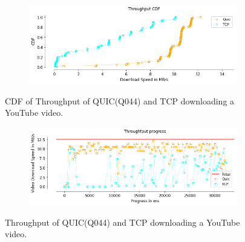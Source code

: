 \begin{frame}

\begin{figure}[!htb]
    \centering
    \begin{subfigure}{0.5\textwidth}
        \includegraphics[width=\linewidth]{./plots/youtube/throughput/ThroughputCDF.png}
    \end{subfigure}
    
    \caption{CDF of Throughput of QUIC(Q044) and TCP downloading a YouTube video.}
\end{figure}

\begin{figure}[!htb]
    
    \begin{subfigure}{0.5\textwidth}
        \includegraphics[width=\linewidth]{./plots/youtube/throughput/Throughtputprogress.png}
    \end{subfigure}
    
    \caption{Throughput of QUIC(Q044) and TCP downloading a YouTube video.}\label{fig:throughput-of-quic-q044-}
\end{figure}

\end{frame}
\clearpage

